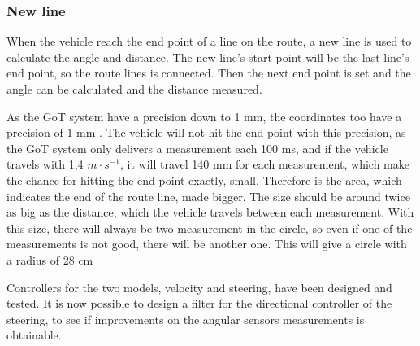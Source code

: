 \subsubsection{New line}
When the vehicle reach the end point of a line on the route, a new line is used to calculate the angle and distance. The new line's start point will be the last line's end point, so the route lines is connected. Then the next end point is set and the angle can be calculated and the distance measured.

As the GoT system have a precision down to 1 mm, the coordinates too have a precision of 1 mm . The vehicle will not hit the end point with this precision, as the GoT system only delivers a measurement each 100 ms, and if the vehicle travels with 1,4 $m \cdot s^{-1}$, it will travel 140 mm for each measurement, which make the chance for hitting the end point exactly, small. Therefore is the area, which indicates the end of the route line, made bigger. The size should be around twice as big as the distance, which the vehicle travels between each measurement. With this size, there will always be two measurement in the circle, so even if one of the measurements is not good, there will be another one. This will give a circle with a radius of 28 cm

Controllers for the two models, velocity and steering, have been designed and tested. It is now possible to design a filter for the directional controller of the steering, to see if improvements on the angular sensors measurements is obtainable.